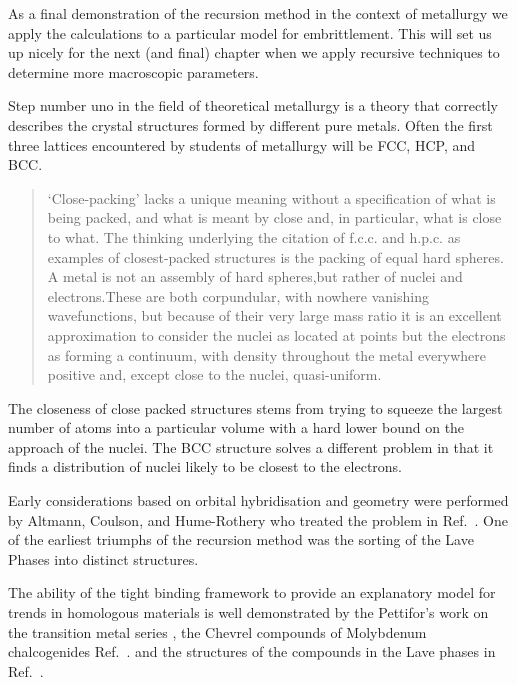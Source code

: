 As a final demonstration of the recursion method in the context of metallurgy 
we apply the calculations to a particular model for embrittlement. This
will set us up nicely for the next (and final) chapter when we apply
recursive techniques to determine more macroscopic parameters. 

Step number uno in the field of theoretical metallurgy is a theory that correctly
describes the crystal structures formed by different pure metals. 
Often the first three lattices encountered by students of metallurgy 
will be FCC, HCP, and BCC.

\begin{quote}
‘Close-packing’ lacks a unique meaning without a specification of 
what is being packed, and what is meant by close and, in particular, 
what is close to what. The thinking underlying the citation of f.c.c. 
and h.p.c. as examples of closest-packed structures is the packing of 
equal hard spheres. A metal is not an assembly of hard spheres,but rather of 
nuclei and electrons.These are both corpundular, with nowhere vanishing 
wavefunctions, but because of their very large mass ratio it is an excellent 
approximation to consider the nuclei as located at points
but the electrons as forming a continuum, with density throughout the metal 
everywhere positive and, except close to the nuclei, quasi-uniform.
\end{quote}

The closeness of close packed structures stems from trying to squeeze
the largest number of atoms into a particular volume
with a hard lower bound on the approach of the nuclei.
The BCC structure solves a different problem in that it finds a
distribution of nuclei likely to be closest to the electrons.

Early considerations based on orbital hybridisation and geometry
were performed by Altmann, Coulson, and Hume-Rothery who treated 
the problem in Ref.~\cite{altmann57}. One of the earliest triumphs 
of the recursion method was the sorting of the Lave 
Phases \cite{haydocklaves75,johannes76} into distinct structures. 

The ability of the tight binding framework
to provide an explanatory model for trends in homologous materials is
well demonstrated by the Pettifor's work on the transition
metal series \cite{pettifor70}, the Chevrel 
compounds of Molybdenum chalcogenides Ref.~\cite{bullet77}.
and the structures of the compounds in the Lave phases 
in Ref.~\cite{johannes76}.

